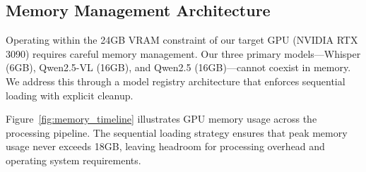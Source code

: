 \subsection{Memory Management Architecture}

Operating within the 24GB VRAM constraint of our target GPU (NVIDIA RTX 3090) requires careful memory management. Our three primary models---Whisper (6GB), Qwen2.5-VL (16GB), and Qwen2.5 (16GB)---cannot coexist in memory. We address this through a model registry architecture that enforces sequential loading with explicit cleanup.

%
%    
%    
%    
%    
%

Figure~\ref{fig:memory_timeline} illustrates GPU memory usage across the processing pipeline. The sequential loading strategy ensures that peak memory usage never exceeds 18GB, leaving headroom for processing overhead and operating system requirements.

